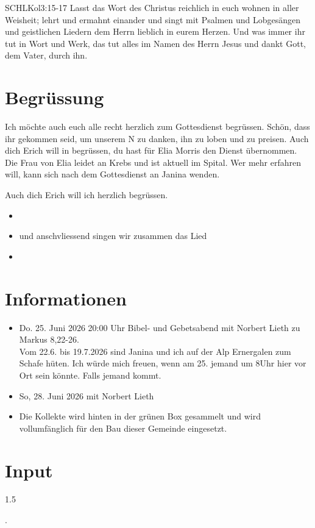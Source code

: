 \documentclass[fontsize=14pt]{mybib}
\newcommand{\Name}{Erich}
\begin{document}
\begin{bibelbox}{SCHL}{Kol}{3:15-17}
    Lasst das Wort des Christus reichlich in euch wohnen in aller Weisheit; lehrt und ermahnt einander und singt mit Psalmen und Lobgesängen und geistlichen Liedern dem Herrn lieblich in eurem Herzen. Und was immer ihr tut in Wort und Werk, das tut alles im Namen des Herrn Jesus und dankt Gott, dem Vater, durch ihn.
\end{bibelbox}
\section{Begrüssung}
Ich möchte auch euch alle recht herzlich zum Gottesdienst begrüssen. Schön, dass ihr gekommen seid, um unserem \herr N zu danken, ihn zu loben und zu preisen. Auch dich Erich will in begrüssen, du hast für Elia Morris den Dienst übernommen. Die Frau von Elia leidet an Krebs und ist aktuell im Spital. Wer mehr erfahren will, kann sich nach dem Gottesdienst an Janina wenden.

Auch dich \Name{} will ich herzlich begrüssen. 
\begin{itemize}
    \item[] 
    \item[] und anschvliessend singen wir zusammen das Lied
    \item[] 
\end{itemize}
\section{Informationen}
\begin{itemize}
    \item {} Do. 25. Juni 2026 20:00 Uhr Bibel- und Gebetsabend mit Norbert Lieth zu Markus 8,22-26.\\
    Vom 22.6. bis 19.7.2026 sind Janina und ich auf der Alp Ernergalen zum Schafe hüten. Ich würde mich freuen, wenn am 25. jemand um 8Uhr hier vor Ort sein könnte. Falls jemand kommt.
    \item {} So, 28. Juni 2026 mit Norbert Lieth
    \item {} Die Kollekte wird hinten in der grünen Box gesammelt und wird vollumfänglich für den Bau dieser Gemeinde eingesetzt.
\end{itemize}
\section{Input}
\begin{spacing}{1.5}
      
    .
\end{spacing}
\end{document}
